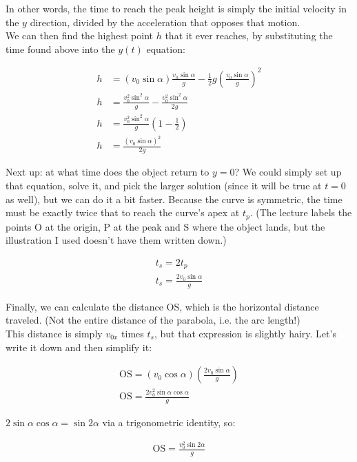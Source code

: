 \documentclass[12pt,a4paper]{report}
\begin{document}
In other words, the time to reach the peak height is simply the initial velocity in the $y$ direction, divided by the acceleration that opposes that motion.\\
We can then find the highest point $h$ that it ever reaches, by substituting the time found above into the $y(t)$ equation:

\begin{align}
h &= (v_0 \sin \alpha) \frac{v_0 \sin \alpha}{g} - \frac{1}{2} g \left(\frac{v_0 \sin \alpha}{g}\right)^2\\
h &= \frac{v_0^2 \sin^2 \alpha}{g} - \frac{v_0^2 \sin^2 \alpha}{2g}\\
h &= \frac{v_0^2 \sin^2 \alpha}{g} \left(1 - \frac{1}{2}\right)\\
h &= \frac{(v_0 \sin \alpha)^2}{2g}
\end{align}

Next up: at what time does the object return to $y = 0$? We could simply set up that equation, solve it, and pick the larger solution (since it will be true at $t = 0$ as well), but we can do it a bit faster. Because the curve is symmetric, the time must be exactly twice that to reach the curve's apex at $t_p$. (The lecture labels the points O at the origin, P at the peak and S where the object lands, but the illustration I used doesn't have them written down.)

\begin{align}
t_s = 2 t_p\\
t_s = \frac{2 v_0 \sin \alpha}{g}
\end{align}

Finally, we can calculate the distance OS, which is the horizontal distance traveled. (Not the entire distance of the parabola, i.e. the arc length!)\\
This distance is simply $v_{0x}$ times $t_s$, but that expression is slightly hairy. Let's write it down and then simplify it:

\begin{align}
\text{OS} = (v_0 \cos \alpha) \left(\frac{2 v_0 \sin \alpha}{g} \right)\\
\text{OS} = \frac{2 v_0^2 \sin \alpha \cos \alpha}{g}
\end{align}

$2 \sin \alpha \cos \alpha = \sin 2 \alpha$ via a trigonometric identity, so:

\begin{align}
\text{OS} = \frac{v_0^2 \sin 2\alpha}{g} \label{eq:lec3_os}
\end{align}
\end{document}
